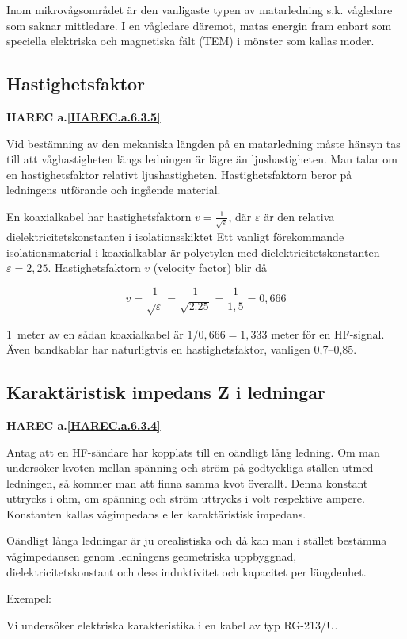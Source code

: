 Inom mikrovågsområdet är den vanligaste typen av matarledning
s.k. vågledare som saknar mittledare. I en vågledare däremot, matas
energin fram enbart som speciella elektriska och magnetiska fält (TEM)
i mönster som kallas moder.

\subsection{Hastighetsfaktor}
\textbf{
HAREC a.\ref{HAREC.a.6.3.5}\label{myHAREC.a.6.3.5}
}

Vid bestämning av den mekaniska längden på en matarledning måste
hänsyn tas till att våghastigheten längs ledningen är lägre än
ljushastigheten. Man talar om en hastighetsfaktor relativt
ljushastigheten. Hastighetsfaktorn beror på ledningens utförande och
ingående material.

En koaxialkabel har hastighetsfaktorn \(v =
\frac{1}{\sqrt{\varepsilon}}\), där \(\varepsilon\) är den relativa
dielektricitetskonstanten i isolationsskiktet Ett vanligt förekommande
isolationsmaterial i koaxialkablar är polyetylen med
dielektricitetskonstanten \(\varepsilon = 2,25\).  Hastighetsfaktorn
\(v\) (velocity factor) blir då

\[
v = \frac{1}{\sqrt{\varepsilon}} = \frac{1}{\sqrt{2.25}} = \frac{1}{1,5} = 0,666
\]

1~meter av en sådan koaxialkabel är \(1/0,666 = 1,333\) meter för en HF-signal.
Även bandkablar har naturligtvis en hastighetsfaktor, vanligen 0,7--0,85.

\subsection{Karaktäristisk impedans Z i ledningar}
\textbf{
HAREC a.\ref{HAREC.a.6.3.4}\label{myHAREC.a.6.3.4}
}

Antag att en HF-sändare har kopplats till en oändligt lång ledning. Om
man undersöker kvoten mellan spänning och ström på godtyckliga ställen
utmed ledningen, så kommer man att finna samma kvot överallt.  Denna
konstant uttrycks i ohm, om spänning och ström uttrycks i volt
respektive ampere. Konstanten kallas vågimpedans eller karaktäristisk
impedans.

Oändligt långa ledningar är ju orealistiska och då kan man i stället
bestämma vågimpedansen genom ledningens geometriska uppbyggnad,
dielektricitetskonstant och dess induktivitet och kapacitet per
längdenhet.

Exempel:

Vi undersöker elektriska karakteristika i en kabel av typ RG-213/U.

